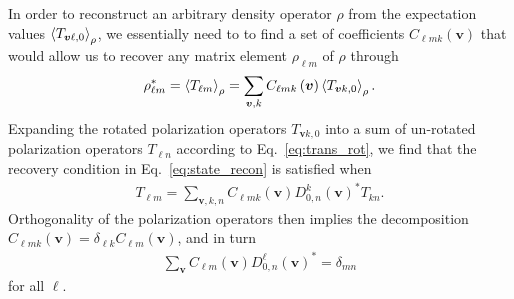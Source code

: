 \documentclass[a4paper,twocolumn,unpublished]{quantumarticle}
\newcommand{\p}[1]{\left(#1\right)} %
\newcommand{\bk}{\Braket} %
\begin{document}
In order to reconstruct an arbitrary density operator $\rho$ from the expectation values $\bk{T_{\bm v\ell,0}}_\rho$, we essentially need to to find a set of coefficients $C_{\ell mk}\p{\bm v}$ that would allow us to recover any matrix element $\rho_{\ell m}$ of $\rho$ through
\begin{align}
  \rho_{\ell m}^* = \bk{T_{\ell m}}_\rho
  = \sum_{\bm v,k} C_{\ell mk}\p{\bm v} \bk{T_{\bm vk,0}}_\rho.
  \label{eq:state_recon}
\end{align}
Expanding the rotated polarization operators $T_{\bm vk,0}$ into a sum of un-rotated polarization operators $T_{\ell n}$ according to Eq.~\eqref{eq:trans_rot}, we find that the recovery condition in Eq.~\eqref{eq:state_recon} is satisfied when
\begin{align}
  T_{\ell m}
  = \sum_{\bm v,k,n} C_{\ell mk}\p{\bm v} D^k_{0,n}\p{\bm v}^* T_{kn}.
\end{align}
Orthogonality of the polarization operators then implies the decomposition $C_{\ell mk}\p{\bm v}=\delta_{\ell k}C_{\ell m}\p{\bm v}$, and in turn
\begin{align}
  \sum_{\bm v} C_{\ell m}\p{\bm v} D^\ell_{0,n}\p{\bm v}^*
  = \delta_{mn}
  \label{eq:tomo_recovery}
\end{align}
for all $\ell$.
\end{document}
